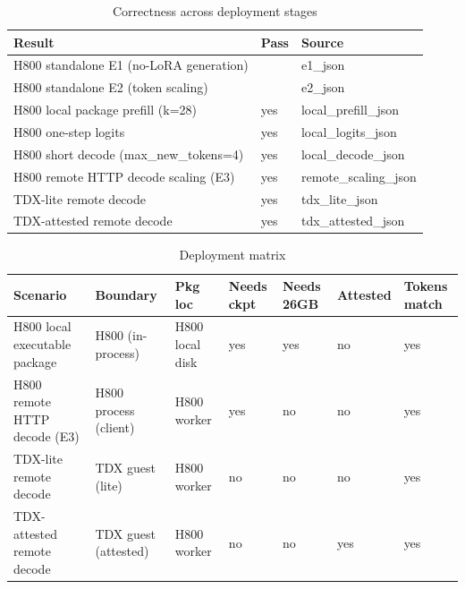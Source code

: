 
\begin{table}[h]
\centering
\caption{Correctness across deployment stages}
\begin{tabular}{lll}
\hline
Result & Pass & Source \\
\hline
H800 standalone E1 (no-LoRA generation) &  & e1\_json \\
H800 standalone E2 (token scaling) &  & e2\_json \\
H800 local package prefill (k=28) & yes & local\_prefill\_json \\
H800 one-step logits & yes & local\_logits\_json \\
H800 short decode (max\_new\_tokens=4) & yes & local\_decode\_json \\
H800 remote HTTP decode scaling (E3) & yes & remote\_scaling\_json \\
TDX-lite remote decode & yes & tdx\_lite\_json \\
TDX-attested remote decode & yes & tdx\_attested\_json \\
\hline
\end{tabular}
\end{table}

\begin{table}[h]
\centering
\caption{Deployment matrix}
\begin{tabular}{lllllll}
\hline
Scenario & Boundary & Pkg loc & Needs ckpt & Needs 26GB & Attested & Tokens match \\
\hline
H800 local executable package & H800 (in-process) & H800 local disk & yes & yes & no & yes \\
H800 remote HTTP decode (E3) & H800 process (client) & H800 worker & yes & no & no & yes \\
TDX-lite remote decode & TDX guest (lite) & H800 worker & no & no & no & yes \\
TDX-attested remote decode & TDX guest (attested) & H800 worker & no & no & yes & yes \\
\hline
\end{tabular}
\end{table}

